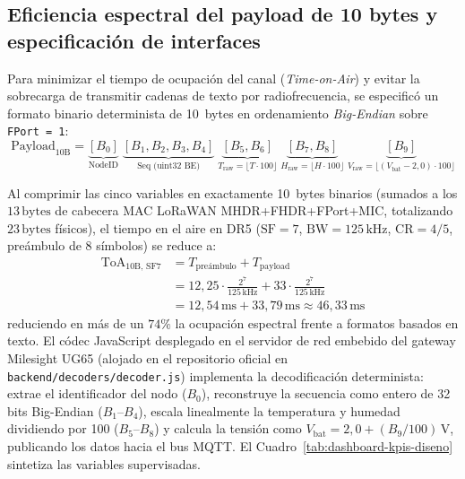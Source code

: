 \documentclass[12pt,oneside,openany,spanish,oldfontcommands]{memoir}
\begin{document}
\subsection{Eficiencia espectral del payload de 10 bytes y especificación de interfaces}\label{sec:interfaces-software}

Para minimizar el tiempo de ocupación del canal (\textit{Time-on-Air}) y evitar la sobrecarga de
transmitir cadenas de texto por radiofrecuencia, se especificó un formato binario determinista
de 10~bytes en ordenamiento \textit{Big-Endian} sobre \texttt{FPort = 1}:
\begin{equation}
\text{Payload}_{10\text{B}} =
\underbrace{[B_0]}_{\text{NodeID}} \;
\underbrace{[B_1, B_2, B_3, B_4]}_{\text{Seq (uint32 BE)}} \;
\underbrace{[B_5, B_6]}_{T_{\text{raw}} = \lfloor T \cdot 100 \rfloor} \;
\underbrace{[B_7, B_8]}_{H_{\text{raw}} = \lfloor H \cdot 100 \rfloor} \;
\underbrace{[B_9]}_{V_{\text{raw}} = \lfloor (V_{\text{bat}} - 2,0) \cdot 100 \rfloor}
\label{eq:payload-10b}
\end{equation}

Al comprimir las cinco variables en exactamente 10~bytes binarios (sumados a los $13\,\text{bytes}$
de cabecera MAC LoRaWAN MHDR+FHDR+FPort+MIC, totalizando $23\,\text{bytes}$ físicos), el tiempo en el
aire en DR5 ($\text{SF}=7$, $\text{BW}=125\,\text{kHz}$, $\text{CR}=4/5$, preámbulo de 8 símbolos)
se reduce a:
\begin{align}
\text{ToA}_{10\text{B, SF7}} &= T_{\text{pre\'ambulo}} + T_{\text{payload}} \nonumber \\
&= 12,25 \cdot \frac{2^7}{125\,\text{kHz}} + 33 \cdot \frac{2^7}{125\,\text{kHz}} \nonumber \\
&= 12,54\,\text{ms} + 33,79\,\text{ms} \approx 46,33\,\text{ms}
\label{eq:toa-calc}
\end{align}
reduciendo en más de un $74\%$ la ocupación espectral frente a formatos basados en texto. El códec
JavaScript desplegado en el servidor de red embebido del gateway Milesight UG65 (alojado en el
repositorio oficial en \texttt{backend/decoders/decoder.js}) implementa la decodificación determinista:
extrae el identificador del nodo ($B_0$), reconstruye la secuencia como entero de 32 bits Big-Endian
($B_1$--$B_4$), escala linealmente la temperatura y humedad dividiendo por 100 ($B_5$--$B_8$) y
calcula la tensión como $V_{\text{bat}} = 2{,}0 + (B_9 / 100)\,\text{V}$, publicando los datos hacia
el bus MQTT. El Cuadro~\ref{tab:dashboard-kpis-diseno} sintetiza las variables supervisadas.
\end{document}
